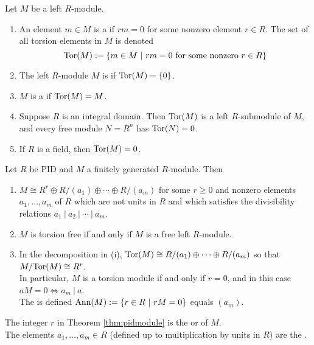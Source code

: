\begin{definition}
Let $M$ be a left $R$-module.
\begin{enumerate}[label=(\roman*)]
\item An element $m \in M$ is a  if $rm = 0$ for some nonzero element $r\in R$. The set of all torsion elements in $M$ is denoted
\begin{equation}
\textnormal{Tor}(M) := \{m \in M \ | \ rm = 0 \textnormal{ for some nonzero } r \in R\} \nonumber
\end{equation}
\item The left $R$-module $M$ is  if $\textnormal{Tor}(M) = \{0\}$.
\item $M$ is a  if $\textnormal{Tor}(M) = M$.
\item Suppose $R$ is an integral domain. Then $\textnormal{Tor}(M)$ is a left $R$-submodule of $M$, and every free module $N=R^n$ has $\textnormal{Tor}(N) = 0$.
\item If $R$ is a field, then $\textnormal{Tor}(M) = 0$.
\end{enumerate}
\end{definition}

\begin{theorem}
\label{thm:pidmodule}
Let $R$ be PID and $M$ a finitely generated $R$-module. Then
\begin{enumerate}[label=(\roman*)]
\item $M \cong R^r \oplus R/(a_1) \oplus \cdots \oplus R/(a_m)$ for some $r \geq 0$ and nonzero elements $a_1, \ldots, a_m$ of $R$ which are not units in $R$ and which satisfies the divisibility relations $a_1 \ | \ a_2 \ | \ \cdots \ | \ a_m$.
\item $M$ is torsion free if and only if $M$ is a free left $R$-module.
\item In the decomposition in (i), $\textnormal{Tor}(M) \cong R/(a_1) \oplus \cdots \oplus R/(a_m)$ so that $M/\textnormal{Tor}(M) \cong R^r$.\\
In particular, $M$ is a torsion module if and only if $r=0$, and in this case $aM = 0 \Leftrightarrow a_m \ | \ a$.\\
The  is defined $\textnormal{Ann}(M) := \{r \in R \ | \ rM = 0\}$ equals $(a_m)$.
\end{enumerate}
\end{theorem}

\begin{definition}
The integer $r$ in Theorem \ref{thm:pidmodule} is the  or  of $M$.\\
The elements $a_1, \ldots, a_m \in R$ (defined up to multiplication by units in $R$) are the .
\end{definition}

